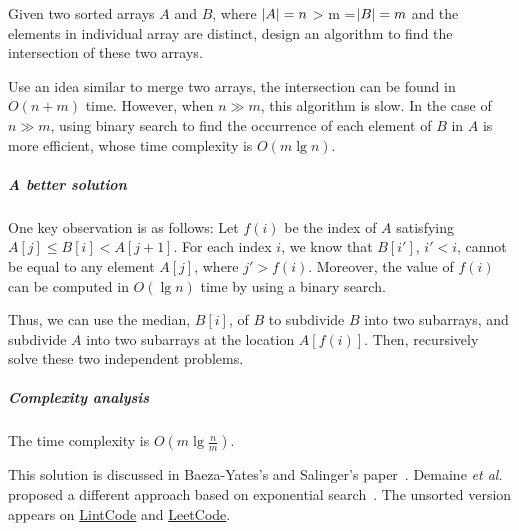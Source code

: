 \begin{Exercise}[title=Intersection of two sorted arrays]
Given two sorted arrays $A$ and $B$, where $\lvert A\rvert = n$ > m =$\lvert B\rvert = m$ and the elements in individual array are distinct, design an algorithm to find the intersection of these two arrays.
\end{Exercise}

\begin{Answer}
Use an idea similar to merge two arrays, the intersection can be found in $O(n + m)$ time. 
However, when $n \gg m$, this algorithm is slow. 
In the case of $n \gg m$, using binary search to find the occurrence of each element of $B$ in $A$ is more efficient, whose time complexity is $O(m \lg n)$.

\subparagraph{A better solution}
One key observation is as follows:
Let $f(i)$ be the index of $A$ satisfying $A[j] \leq B[i] < A[j + 1]$.
For each index $i$, we know that $B[i']$, $i' < i$, cannot be equal to any element $A[j]$, where $j' > f(i)$.
Moreover, the value of $f(i)$ can be computed in $O(\lg n)$ time by using a binary search.

Thus, we can use the median, $B[i]$, of $B$ to subdivide $B$ into two subarrays, and subdivide $A$ into two subarrays at the location $A[f(i)]$.
Then, recursively solve these two independent problems.

\subparagraph{Complexity analysis} 
The time complexity is $O(m \lg \frac{n}{m})$.

\begin{remark}
This solution is discussed in Baeza-Yates's and Salinger's paper~\cite{Baeza-Yates2010}.
Demaine \textit{et al.} proposed a different approach based on exponential search~\cite{Demaine2000}.
The unsorted version appears on \href{http://www.lintcode.com/en/problem/intersection-of-two-arrays/}{LintCode} and \href{https://leetcode.com/problems/intersection-of-two-arrays/}{LeetCode}.
\end{remark}
\end{Answer}


